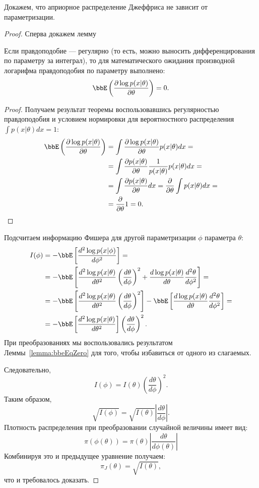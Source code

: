 Докажем, что априорное распределение Джеффриса не зависит от параметризации.
\begin{proof}

Сперва докажем лемму
\begin{Lemma}
\label{lemma:bbeEqZero}
Если правдоподобие --- регулярно (то есть, можно выносить дифференцирования по параметру за интеграл), то
для математического ожидания производной логарифма правдоподобия по параметру выполнено:
\[
\bbE \left(\frac{\partial \log p(x | \theta)}{\partial \theta} \right) = 0.
\]
\end{Lemma}
\begin{proof}
Получаем результат теоремы воспользовавшись регулярностью правдоподобия и условием нормировки для вероятностного распределения $\int p(x| \theta) dx = 1$:
\begin{align*}
\bbE \left(\frac{\partial \log p(x | \theta)}{\partial \theta} \right) &= \int \frac{\partial \log p(x | \theta)}{\partial \theta} p(x| \theta) dx = \\
                                                         &= \int \frac{\partial p(x | \theta)}{\partial \theta} \frac{1}{p(x | \theta)} p(x| \theta) dx =\\
                                                         &= \int \frac{\partial p(x | \theta)}{\partial \theta} dx = \frac{\partial}{\partial \theta} \int p(x| \theta) dx =\\
                                                         &= \frac{\partial}{\partial \theta} 1 = 0. \\
\end{align*}
\end{proof}

Подсчитаем информацию Фишера для другой параметризации $\phi$ параметра $\theta$:
\begin{align*}
I(\phi) &= -\bbE \left[\frac{d^2 \log p(x | \phi)}{d \phi^2} \right] = \\
&= -\bbE \left[\frac{d^2 \log p(x | \theta)}{d \theta^2}  \left(\frac{d \theta}{d \phi} \right)^2 + \frac{d \log p(x | \theta)}{d \theta} \frac{d^2 \theta}{d \phi^2} \right] = \\
&= -\bbE \left[\frac{d^2 \log p(x | \theta)}{d \theta^2}  \left(\frac{d \theta}{d \phi} \right)^2 \right] -\bbE \left[ \frac{d \log p(x | \theta)}{d \theta} \frac{d^2 \theta}{d \phi^2} \right] = \\
&= -\bbE \left[\frac{d^2 \log p(x | \theta)}{d \theta^2} \right] \left(\frac{d \theta}{d \phi} \right)^2.
\end{align*}
При преобразованиях мы воспользовались результатом Леммы~\ref{lemma:bbeEqZero} для того, чтобы избавиться от одного из слагаемых.

Следовательно,
\[
I(\phi) = I(\theta) \left(\frac{d \theta}{d \phi} \right)^2.
\]
Таким образом,
\[
\sqrt{I(\phi)} = \sqrt{I(\theta)} \left| \frac{d \theta}{d \phi} \right|.
\]
Плотность распределения при преобразовании случайной величины имеет вид:
\[
\pi(\phi(\theta)) = \pi(\theta) \left| \frac{d \theta}{d \phi(\theta)} \right|
\]
Комбинируя это и предыдущее уравнение получаем:
\[
\pi_J(\theta) = \sqrt{I(\theta)},
\]
что и требовалось доказать.

\end{proof}

